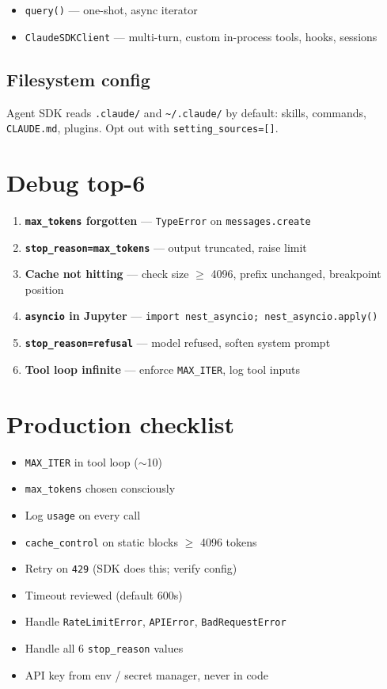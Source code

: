 \documentclass[11pt,a4paper]{article}
\begin{document}
\begin{itemize}
\item \texttt{query()} --- one-shot, async iterator
\item \texttt{ClaudeSDKClient} --- multi-turn, custom in-process tools, hooks, sessions
\end{itemize}

\subsection{Filesystem config}

Agent SDK reads \texttt{.claude/} and \texttt{\textasciitilde/.claude/} by default: skills, commands, \texttt{CLAUDE.md}, plugins. Opt out with \texttt{setting\_sources=[]}.

\section{Debug top-6}

\begin{enumerate}
\item \textbf{\texttt{max\_tokens} forgotten} --- \texttt{TypeError} on \texttt{messages.create}
\item \textbf{\texttt{stop\_reason=max\_tokens}} --- output truncated, raise limit
\item \textbf{Cache not hitting} --- check size $\ge$ 4096, prefix unchanged, breakpoint position
\item \textbf{\texttt{asyncio} in Jupyter} --- \texttt{import nest\_asyncio; nest\_asyncio.apply()}
\item \textbf{\texttt{stop\_reason=refusal}} --- model refused, soften system prompt
\item \textbf{Tool loop infinite} --- enforce \texttt{MAX\_ITER}, log tool inputs
\end{enumerate}

\section{Production checklist}

\begin{itemize}[leftmargin=2em]
\item[$\square$] \texttt{MAX\_ITER} in tool loop ($\sim$10)
\item[$\square$] \texttt{max\_tokens} chosen consciously
\item[$\square$] Log \texttt{usage} on every call
\item[$\square$] \texttt{cache\_control} on static blocks $\ge$ 4096 tokens
\item[$\square$] Retry on \texttt{429} (SDK does this; verify config)
\item[$\square$] Timeout reviewed (default 600s)
\item[$\square$] Handle \texttt{RateLimitError}, \texttt{APIError}, \texttt{BadRequestError}
\item[$\square$] Handle all 6 \texttt{stop\_reason} values
\item[$\square$] API key from env / secret manager, never in code
\end{itemize}
\end{document}
